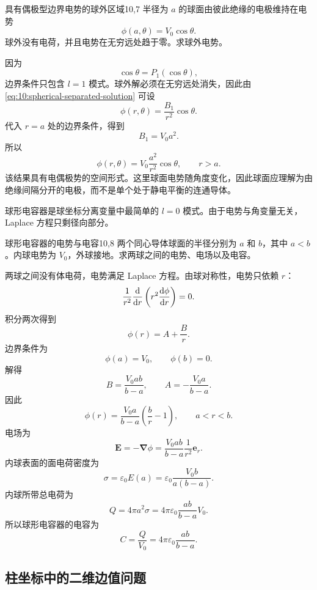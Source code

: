 \begin{example}{具有偶极型边界电势的球外区域}{10,7}
半径为 $a$ 的球面由彼此绝缘的电极维持在电势
\[
\phi(a,\theta)=V_{0}\cos\theta.
\]
球外没有电荷，并且电势在无穷远处趋于零。求球外电势。

\begin{solution}
因为
\[
\cos\theta=P_{1}(\cos\theta),
\]
边界条件只包含 $l=1$ 模式。球外解必须在无穷远处消失，因此由
\eqref{eq:10:spherical-separated-solution} 可设
\[
\phi(r,\theta)
=
\frac{B_{1}}{r^{2}}\cos\theta.
\]
代入 $r=a$ 处的边界条件，得到
\[
B_{1}=V_{0}a^{2}.
\]
所以
\[
\phi(r,\theta)
=
V_{0}\frac{a^{2}}{r^{2}}\cos\theta,
\qquad
r>a.
\]
该结果具有电偶极势的空间形式。这里球面电势随角度变化，因此球面应理解为由绝缘间隔分开的电极，而不是单个处于静电平衡的连通导体。
\end{solution}
\end{example}

球形电容器是球坐标分离变量中最简单的 $l=0$ 模式。由于电势与角变量无关，Laplace 方程只剩径向部分。

\begin{example}{球形电容器的电势与电容}{10,8}
两个同心导体球面的半径分别为 $a$ 和 $b$，其中 $a<b$。内球电势为 $V_{0}$，外球接地。求两球之间的电势、电场以及电容。

\begin{solution}
两球之间没有体电荷，电势满足 Laplace 方程。由球对称性，电势只依赖 $r$：
\[
\frac{1}{r^{2}}
\frac{\mathop{}\!\mathrm{d}}{\mathop{}\!\mathrm{d} r}
\left(
r^{2}\frac{\mathop{}\!\mathrm{d}\phi}{\mathop{}\!\mathrm{d} r}
\right)
=
0.
\]
积分两次得到
\[
\phi(r)=A+\frac{B}{r}.
\]
边界条件为
\[
\phi(a)=V_{0},
\qquad
\phi(b)=0.
\]
解得
\[
B
=
\frac{V_{0}ab}{b-a},
\qquad
A
=
-\frac{V_{0}a}{b-a}.
\]
因此
\[
\phi(r)
=
\frac{V_{0}a}{b-a}
\left(
\frac{b}{r}-1
\right),
\qquad a<r<b.
\]
电场为
\[
\bm{E}
=
-\bm{\nabla}\phi
=
\frac{V_{0}ab}{b-a}
\frac{1}{r^{2}}\bm{e}_{r}.
\]
内球表面的面电荷密度为
\[
\sigma
=
\varepsilon_{0}E(a)
=
\varepsilon_{0}
\frac{V_{0}b}{a(b-a)}.
\]
内球所带总电荷为
\[
Q
=
4\pi a^{2}\sigma
=
4\pi\varepsilon_{0}
\frac{ab}{b-a}V_{0}.
\]
所以球形电容器的电容为
\[
C
=
\frac{Q}{V_{0}}
=
4\pi\varepsilon_{0}
\frac{ab}{b-a}.
\]
\end{solution}
\end{example}

\subsection{柱坐标中的二维边值问题}


